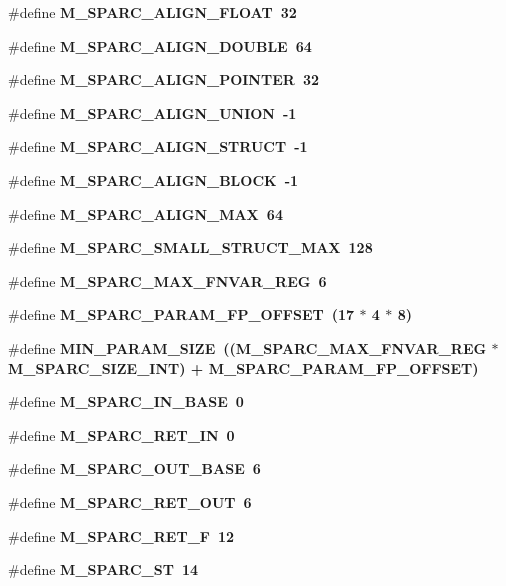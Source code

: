 \begin{CompactItemize}
\#define \bf{M\_\-SPARC\_\-ALIGN\_\-FLOAT}~32
\item 
\#define \bf{M\_\-SPARC\_\-ALIGN\_\-DOUBLE}~64
\item 
\#define \bf{M\_\-SPARC\_\-ALIGN\_\-POINTER}~32
\item 
\#define \bf{M\_\-SPARC\_\-ALIGN\_\-UNION}~-1
\item 
\#define \bf{M\_\-SPARC\_\-ALIGN\_\-STRUCT}~-1
\item 
\#define \bf{M\_\-SPARC\_\-ALIGN\_\-BLOCK}~-1
\item 
\#define \bf{M\_\-SPARC\_\-ALIGN\_\-MAX}~64
\item 
\#define \bf{M\_\-SPARC\_\-SMALL\_\-STRUCT\_\-MAX}~128
\item 
\#define \bf{M\_\-SPARC\_\-MAX\_\-FNVAR\_\-REG}~6
\item 
\#define \bf{M\_\-SPARC\_\-PARAM\_\-FP\_\-OFFSET}~(17 $\ast$ 4 $\ast$ 8)
\item 
\#define \bf{MIN\_\-PARAM\_\-SIZE}~((M\_\-SPARC\_\-MAX\_\-FNVAR\_\-REG $\ast$ M\_\-SPARC\_\-SIZE\_\-INT) + M\_\-SPARC\_\-PARAM\_\-FP\_\-OFFSET)
\item 
\#define \bf{M\_\-SPARC\_\-IN\_\-BASE}~0
\item 
\#define \bf{M\_\-SPARC\_\-RET\_\-IN}~0
\item 
\#define \bf{M\_\-SPARC\_\-OUT\_\-BASE}~6
\item 
\#define \bf{M\_\-SPARC\_\-RET\_\-OUT}~6
\item 
\#define \bf{M\_\-SPARC\_\-RET\_\-F}~12
\item 
\#define \bf{M\_\-SPARC\_\-ST}~14
\end{CompactItemize}
